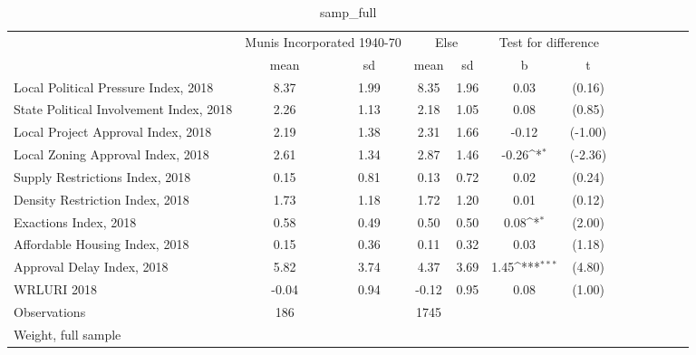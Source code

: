 \begin{table}[htbp]\centering
\def\sym#1{\ifmmode^{#1}\else\(^{#1}\)\fi}
\caption{samp\_full \label{tab1}}
\begin{tabular}{l*{3}{cccc}}
\toprule
                    &\multicolumn{2}{c}{Munis Incorporated 1940-70}&\multicolumn{2}{c}{Else} &\multicolumn{2}{c}{Test for difference}\\
                    &        mean&          sd&        mean&          sd&           b         &           t\\
\midrule
Local Political Pressure Index, 2018&        8.37&        1.99&        8.35&        1.96&        0.03         &      (0.16)\\
State Political Involvement Index, 2018&        2.26&        1.13&        2.18&        1.05&        0.08         &      (0.85)\\
Local Project Approval Index, 2018&        2.19&        1.38&        2.31&        1.66&       -0.12         &     (-1.00)\\
Local Zoning Approval Index, 2018&        2.61&        1.34&        2.87&        1.46&       -0.26\sym{*}  &     (-2.36)\\
Supply Restrictions Index, 2018&        0.15&        0.81&        0.13&        0.72&        0.02         &      (0.24)\\
Density Restriction Index, 2018&        1.73&        1.18&        1.72&        1.20&        0.01         &      (0.12)\\
Exactions Index, 2018&        0.58&        0.49&        0.50&        0.50&        0.08\sym{*}  &      (2.00)\\
Affordable Housing Index, 2018&        0.15&        0.36&        0.11&        0.32&        0.03         &      (1.18)\\
Approval Delay Index, 2018&        5.82&        3.74&        4.37&        3.69&        1.45\sym{***}&      (4.80)\\
WRLURI 2018         &       -0.04&        0.94&       -0.12&        0.95&        0.08         &      (1.00)\\
\midrule
Observations        &         186&            &        1745&            &                     &            \\
\bottomrule
\multicolumn{7}{l}{\footnotesize Weight, full sample}\\
\end{tabular}
\end{table}
